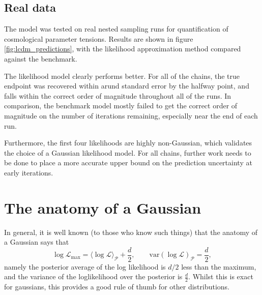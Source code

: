 \documentclass[usenatbib]{mnras} %
\begin{document}
\subsection{Real data}
The model was tested on real nested sampling runs for quantification of cosmological parameter tensions. Results are shown in figure \ref{fig:lcdm_predictions}, with the likelihood approximation method compared against the benchmark.
\par
The likelihood model clearly performs better. For all of the chains, the true endpoint was recovered within arund standard error by the halfway point, and falls within the correct order of magnitude throughout all of the runs. In comparison, the benchmark model mostly failed to get the correct order of magnitude on the number of iterations remaining, especially near the end of each run.
\par
Furthermore, the first four likelihoods are highly non-Gaussian, which validates the choice of a Gaussian likelihood model. For all chains, further work needs to be done to place a more accurate upper bound on the prediction uncertainty at early iterations. 




\section{The anatomy of a Gaussian}

In general, it is well known (to those who know such things) that the anatomy of a Gaussian says that
\begin{equation}
    \boxed{\log\mathcal{L}_\mathrm{max} = \langle\log\mathcal{L}\rangle_\mathcal{P} + \frac{d}{2}},  \qquad \boxed{\mathrm{var}(\log\mathcal{L})_\mathcal{P} = \frac{d}{2}},
\end{equation}
namely the posterior average of the log likelihood is $d/2$ less than the maximum, and the variance of the loglikelihood over the posterior is $\frac{d}{2}$. Whilst this is exact for gaussians, this provides a good rule of thumb for other distributions. 
\end{document}
